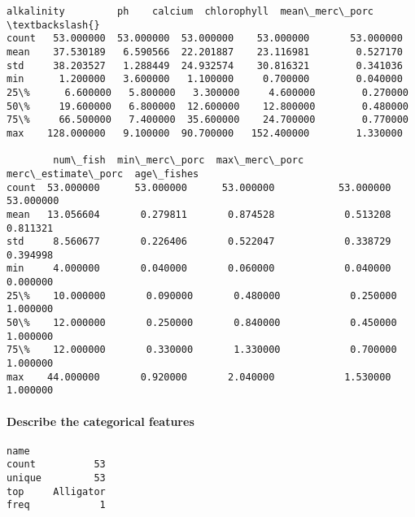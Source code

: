\documentclass[11pt]{article}
\begin{document}
            \begin{tcolorbox}[breakable, size=fbox, boxrule=.5pt, pad at break*=1mm, opacityfill=0]
\begin{Verbatim}[commandchars=\\\{\}]
       alkalinity         ph    calcium  chlorophyll  mean\_merc\_porc  \textbackslash{}
count   53.000000  53.000000  53.000000    53.000000       53.000000
mean    37.530189   6.590566  22.201887    23.116981        0.527170
std     38.203527   1.288449  24.932574    30.816321        0.341036
min      1.200000   3.600000   1.100000     0.700000        0.040000
25\%      6.600000   5.800000   3.300000     4.600000        0.270000
50\%     19.600000   6.800000  12.600000    12.800000        0.480000
75\%     66.500000   7.400000  35.600000    24.700000        0.770000
max    128.000000   9.100000  90.700000   152.400000        1.330000

        num\_fish  min\_merc\_porc  max\_merc\_porc  merc\_estimate\_porc  age\_fishes
count  53.000000      53.000000      53.000000           53.000000   53.000000
mean   13.056604       0.279811       0.874528            0.513208    0.811321
std     8.560677       0.226406       0.522047            0.338729    0.394998
min     4.000000       0.040000       0.060000            0.040000    0.000000
25\%    10.000000       0.090000       0.480000            0.250000    1.000000
50\%    12.000000       0.250000       0.840000            0.450000    1.000000
75\%    12.000000       0.330000       1.330000            0.700000    1.000000
max    44.000000       0.920000       2.040000            1.530000    1.000000
\end{Verbatim}
\end{tcolorbox}
        
    \hypertarget{describe-the-categorical-features}{%
\paragraph{Describe the categorical
features}\label{describe-the-categorical-features}}

            \begin{tcolorbox}[breakable, size=fbox, boxrule=.5pt, pad at break*=1mm, opacityfill=0]
\begin{Verbatim}[commandchars=\\\{\}]
             name
count          53
unique         53
top     Alligator
freq            1
\end{Verbatim}
\end{tcolorbox}
        
\end{document}
